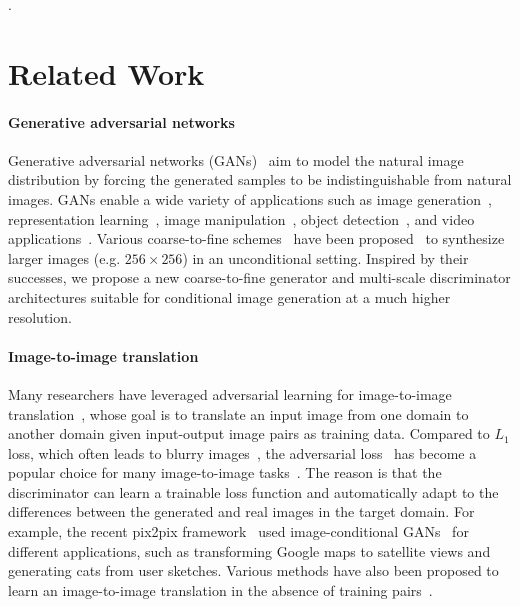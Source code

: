 .

\section{Related Work} \label{sec:related}

\paragraph{Generative adversarial networks} Generative adversarial networks (GANs)~\cite{goodfellow2014generative} aim to model the natural image distribution by forcing the generated samples to be indistinguishable from natural images. GANs enable a wide variety of applications such as image generation~\cite{radford2015unsupervised,zhao2016energy,arjovsky2017wasserstein}, representation learning~\cite{salimans2016improved}, image manipulation~\cite{zhu2016generative}, object detection~\cite{li2017perceptual}, and video applications~\cite{mathieu2015deep,vondrick2016generating,tulyakov2017mocogan}. Various coarse-to-fine schemes~\cite{burt1983laplacian} have been proposed~\cite{denton2015deep,huang2017sgan,zhang2016stackgan,karras2017progressive} to synthesize larger images (e.g. $256\times 256$) in an unconditional setting. Inspired by their successes, we propose a new coarse-to-fine generator and multi-scale discriminator architectures suitable for conditional image generation at a much higher resolution.

\paragraph{Image-to-image translation} Many researchers have leveraged adversarial learning for image-to-image translation~\cite{isola2016image}, whose goal is to translate an input image from one domain to another domain given input-output image pairs as training data. Compared to $L_1$  loss, which often leads to blurry images~\cite{isola2016image,johnson2016perceptual}, the adversarial loss~\cite{goodfellow2014generative} has become a popular choice for many image-to-image tasks~\cite{wang2016generative,pathak2016context,karacan2016learning,zhang2017age,ledig2016photo,sangkloy2016scribbler,kaneko2017generative,dong2017semantic,zhu2017toward}. The reason is that the discriminator can learn a trainable loss function and automatically adapt to the differences between the generated and real images in the target domain. For example, the recent pix2pix framework~\cite{isola2016image} used image-conditional GANs~\cite{mirza2014conditional} for different applications, such as transforming Google maps to satellite views and generating cats from user sketches. Various methods have also been proposed to learn an image-to-image translation in the absence of training pairs~\cite{liu2016coupled,bousmalis2016unsupervised,liu2016unsupervised,shrivastava2016learning,taigman2016unsupervised,yi2017dualgan,zhu2017unpaired,tungadversarial}.

